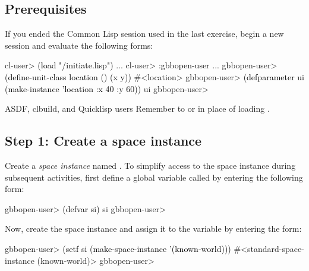 \documentclass[10pt,twoside,english,pdftex]{article}
\begin{document}
\fndocrule

\subsection*{Prerequisites}

%
%
%
If you ended the Common Lisp session used in the last exercise, begin a new
session and evaluate the following forms:
%
\W\supp
\begin{example}
\textcolor{darkergray}{%
  cl-user> \textcolor{black}{(load "/initiate.lisp")}
     ...
  cl-user> \textcolor{black}{:gbbopen-user}
     ...
  gbbopen-user> \textcolor{black}{(define-unit-class location ()
                  (x y))}
  #<location>
  gbbopen-user> \textcolor{black}{(defparameter ui (make-instance 'location :x 40 :y 60))}
  ui
  gbbopen-user>}
\end{example}

%
%
\begin{notebox}{ASDF, clbuild, and Quicklisp users}
  Remember to  or
   in place of loading
  .
\end{notebox}

\subsection*{Step 1: Create a space instance}

%
%
Create a \textit{space instance\/} named .  To
simplify access to the space instance during subsequent activities, first
define a global variable called  by entering the following form:
%
\W\supp
\begin{example}
\textcolor{darkergray}{%
  gbbopen-user> \textcolor{black}{(defvar si)}
  si
  gbbopen-user>}
\end{example}

%
%
Now, create the space instance and assign it to the variable  by
entering the form:
%
\W\supp
\begin{example}
\textcolor{darkergray}{%
  gbbopen-user> \textcolor{black}{(setf si (make-space-instance '(known-world)))}
  #<standard-space-instance (known-world)>
  gbbopen-user>}
\end{example}
\end{document}
